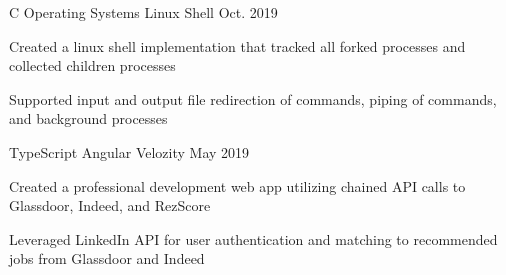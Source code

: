 


\begin{cventries}


\cventry
{C {\vert} Operating Systems} %
{Linux Shell} %
{} %
{Oct. 2019} %
{ %
\begin{cvitems}
\item {Created a linux shell implementation that tracked all forked processes and collected children processes}
\item{Supported input and output file redirection of commands, piping of commands, and background processes}
\end{cvitems}
}


\cventry
{TypeScript {\vert} Angular} %
{Velozity} %
{} %
{May 2019} %
{ %
\begin{cvitems}
\item {Created a professional development web app utilizing chained API calls to Glassdoor, Indeed, and RezScore}
\item{Leveraged LinkedIn API for user authentication and matching to recommended jobs from Glassdoor and Indeed}
\end{cvitems}
}


\end{cventries}
